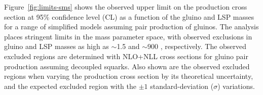 Figure~\ref{fig:limits-sms} shows the observed upper limit on the
production cross section at 95\% confidence level (CL) as a function
of the gluino and LSP masses for
a range of simplified models assuming pair production of gluinos. 
The analysis places stringent limits in the mass parameter space, with observed exclusions in gluino and LSP masses as high as $\sim$1.5 \TeV and $\sim$900 \GeV, respectively.
The observed excluded regions are determined with NLO+NLL
cross sections for gluino pair production assuming decoupled squarks. Also shown are the
observed excluded regions when varying the production cross section by
its theoretical uncertainty, and the expected excluded region 
with the ${\pm}1$ standard-deviation ($\sigma$) variations. 

